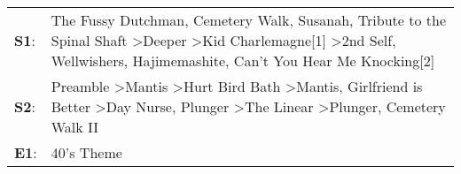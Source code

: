 \begin{supertabular}{p{0.03\textwidth}p{0.92\textwidth}}
 \textbf{S1}:  &  The Fussy Dutchman\textsuperscript{}, \enspace Cemetery Walk\textsuperscript{}, \enspace Susanah\textsuperscript{}, \enspace Tribute to the Spinal Shaft\textsuperscript{} \textgreater \enspace Deeper\textsuperscript{} \textgreater \enspace Kid Charlemagne[1]\textsuperscript{} \textgreater \enspace 2nd Self\textsuperscript{}, \enspace Wellwishers\textsuperscript{}, \enspace Hajimemashite\textsuperscript{}, \enspace Can't You Hear Me Knocking[2]\textsuperscript{}  \enspace  \\
 \textbf{S2}:  &             Preamble\textsuperscript{} \textgreater \enspace Mantis\textsuperscript{} \textgreater \enspace Hurt Bird Bath\textsuperscript{} \textgreater \enspace Mantis\textsuperscript{}, \enspace Girlfriend is Better\textsuperscript{} \textgreater \enspace Day Nurse\textsuperscript{}, \enspace Plunger\textsuperscript{} \textgreater \enspace The Linear\textsuperscript{} \textgreater \enspace Plunger\textsuperscript{}, \enspace Cemetery Walk II\textsuperscript{}  \enspace  \\
 \textbf{E1}:  &                                                                                                                                                                                                                                                                                                                                                                                                                                                       40's Theme\textsuperscript{}  \enspace  \\
\end{supertabular}
